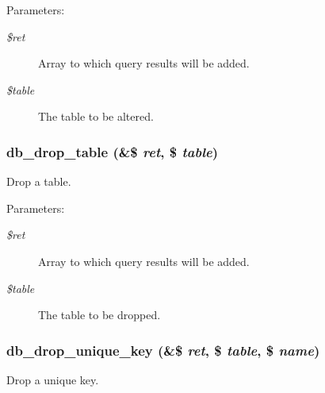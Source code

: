 \begin{Desc}
\item[Parameters:]
\begin{description}
\item[{\em \$ret}]Array to which query results will be added. \item[{\em \$table}]The table to be altered. \end{description}
\end{Desc}
\hypertarget{group__schemaapi_g1da2016702d7da653316aa34fcd86bd9}{
\subsubsection[{db\_\-drop\_\-table}]{\setlength{\rightskip}{0pt plus 5cm}db\_\-drop\_\-table (\&\$ {\em ret}, \/  \$ {\em table})}}
\label{group__schemaapi_g1da2016702d7da653316aa34fcd86bd9}


Drop a table.

\begin{Desc}
\item[Parameters:]
\begin{description}
\item[{\em \$ret}]Array to which query results will be added. \item[{\em \$table}]The table to be dropped. \end{description}
\end{Desc}
\hypertarget{group__schemaapi_g727ffb0cbdb6bc2afd5803b09e296603}{
\subsubsection[{db\_\-drop\_\-unique\_\-key}]{\setlength{\rightskip}{0pt plus 5cm}db\_\-drop\_\-unique\_\-key (\&\$ {\em ret}, \/  \$ {\em table}, \/  \$ {\em name})}}
\label{group__schemaapi_g727ffb0cbdb6bc2afd5803b09e296603}


Drop a unique key.

